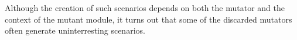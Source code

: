 %
Although the creation of such scenarios depends on both the mutator and the
context of the mutant module, it turns out that some of the discarded mutators 
often generate uninterresting scenarios.



